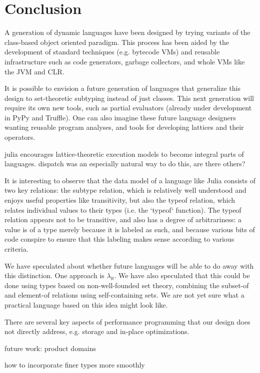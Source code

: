 \chapter{Conclusion}




A generation of dynamic languages have been designed by trying variants of
the class-based object oriented paradigm. This process has been aided by
the development of standard techniques (e.g. bytecode VMs) and reusable
infrastructure such as code generators, garbage collectors, and whole VMs
like the JVM and CLR.

It is possible to envision a future generation of languages that generalize
this design to set-theoretic subtyping instead of just classes. This next
generation will require its own new tools, such as partial evaluators (already
under development in PyPy and Truffle). One can also imagine these future
language designers wanting reusable program analyses, and tools for
developing lattices and their operators.

julia encourages lattice-theoretic execution models to become integral
parts of languages. dispatch was an especially natural way to do this,
are there others?


It is interesting to observe that the data model of a language like Julia
consists of two key relations: the subtype relation, which is relatively
well understood and enjoys useful properties like transitivity, but also
the typeof relation, which relates individual values to their types
(i.e. the `typeof` function). The typeof relation appears not to be
transitive, and also has a degree of arbitrariness: a value is of a type
merely because it is labeled as such, and because various bits of code
conspire to ensure that this labeling makes sense according to various
criteria.

We have speculated about whether future languages will be able to do away
with this distinction. One approach is $\lambda_{\aleph}$. We have also
speculated that this could be done using types based on non-well-founded
set theory, combining the subset-of and element-of relations using
self-containing sets. We are not yet sure what a practical language based
on this idea might look like.


There are several key aspects of performance programming that our design
does not directly address, e.g.  storage and in-place optimizations.

future work:
product domains

how to incorporate finer types more smoothly


